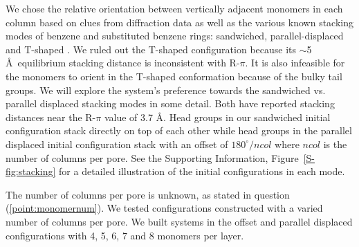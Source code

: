 \documentclass[journal=jpcbfk,manusciprt=article]{achemso}
\begin{document}

  We chose the relative orientation between vertically adjacent monomers in each column 
  based on clues from diffraction data as well as the various known stacking modes of 
  benzene and substituted benzene rings: sandwiched, parallel-displaced and T-shaped
  \cite{sinnokrot_estimates_2002}. We ruled out the T-shaped configuration
  because its $\sim$5 \AA~equilibrium stacking distance \cite{sinnokrot_estimates_2002}
  is inconsistent with R-$\pi$. It is also infeasible for the monomers to orient in the 
  T-shaped conformation because of the bulky tail groups. We will explore the system's 
  preference towards the sandwiched vs. parallel displaced stacking modes in some detail.
  Both have reported stacking distances near the R-$\pi$ value of 3.7 \AA. Head groups in
  our sandwiched initial configuration stack directly on top of each other while
  head groups in the parallel displaced initial configuration stack with an offset
  of $180^\circ/ncol$ where $ncol$ is the number of columns per pore. See the Supporting
  Information, Figure~\ref{S-fig:stacking} for a detailed illustration of the initial
  configurations in each mode.
  

  The number of columns per pore is unknown, as stated in question
  (\ref{point:monomernum}). We tested configurations constructed with a varied
  number of columns per pore. We built systems in the offset and parallel
  displaced configurations with 4, 5, 6, 7 and 8 monomers per layer.
\end{document}
